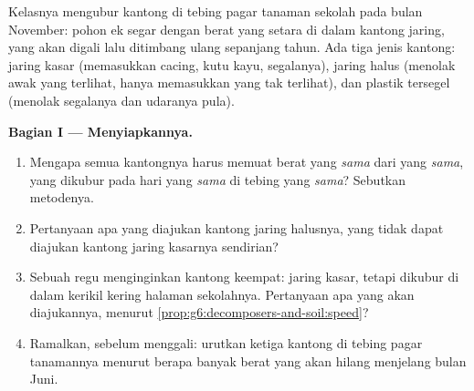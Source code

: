 \begin{problem}\label{pb:g6:decomposers-and-soil:1}
Kelasnya mengubur kantong  di tebing pagar tanaman sekolah pada
bulan November:  pohon ek segar dengan berat yang setara di dalam
kantong jaring, yang akan digali lalu ditimbang ulang sepanjang tahun.
Ada tiga jenis kantong: jaring kasar (memasukkan cacing, kutu kayu,
segalanya), jaring halus (menolak awak yang terlihat, hanya
memasukkan yang tak terlihat), dan plastik tersegel (menolak segalanya
dan udaranya pula).

\medskip\noindent\textbf{Bagian I --- Menyiapkannya.}
\begin{enumerate}
  \item Mengapa semua kantongnya harus memuat berat yang \emph{sama}
        dari  yang \emph{sama}, yang dikubur pada hari yang
        \emph{sama} di tebing yang \emph{sama}? Sebutkan metodenya.
  \item Pertanyaan apa yang diajukan kantong jaring halusnya, yang
        tidak dapat diajukan kantong jaring kasarnya sendirian?
  \item Sebuah regu menginginkan kantong keempat: jaring kasar, tetapi
        dikubur di dalam kerikil kering halaman sekolahnya. Pertanyaan
        apa yang akan diajukannya, menurut
        \cref{prop:g6:decomposers-and-soil:speed}?
  \item Ramalkan, sebelum menggali: urutkan ketiga kantong di tebing
        pagar tanamannya menurut berapa banyak berat  yang akan
        hilang menjelang bulan Juni.
\end{enumerate}


\end{problem}
